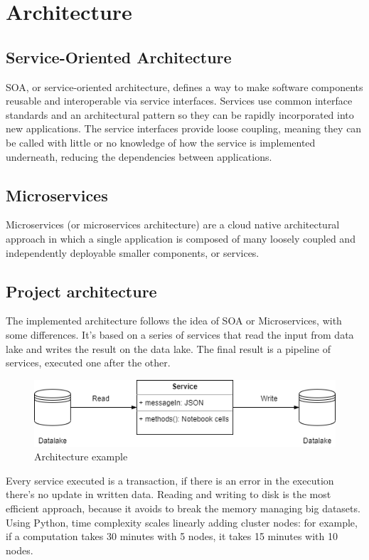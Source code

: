 \documentclass[\main/main.tex]{subfiles}
\begin{document}
\chapter{Architecture}

\section{Service-Oriented Architecture}
SOA, or service-oriented architecture, defines a way to make software components reusable and interoperable via service interfaces. Services use common interface standards and an architectural pattern so they can be rapidly incorporated into new applications. The service interfaces provide loose coupling, meaning they can be called with little or no knowledge of how the service is implemented underneath, reducing the dependencies between applications. 
\cite{SOA_ibm}

\section{Microservices}
Microservices (or microservices architecture) are a cloud native architectural approach in which a single application is composed of many loosely coupled and independently deployable smaller components, or services. 
\cite{microservices_ibm}

\section{Project architecture}
The implemented architecture follows the idea of SOA or Microservices, with some differences. It's based on a series of services that read the input from data lake and writes the result on the data lake. The final result is a pipeline of services, executed one after the other.
\begin{figure}[h]
    \centering
    \includegraphics[scale=0.75]{images/architecture/architecture_service_example.png}
    \caption{Architecture example}
    \label{fig:architecture_example}
\end{figure}
Every service executed is a transaction, if there is an error in the execution there's no update in written data. Reading and writing to disk is the most efficient approach, because it avoids to break the memory managing big datasets. Using Python, time complexity scales linearly adding cluster nodes: for example, if a computation takes 30 minutes with 5 nodes, it takes 15 minutes with 10 nodes. 
\end{document}
